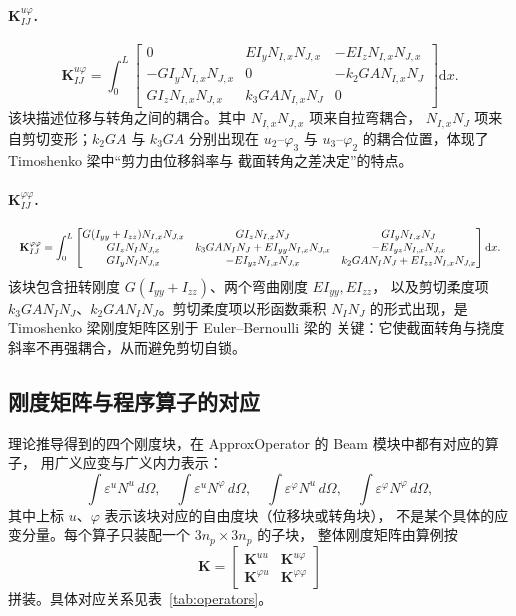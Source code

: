 \documentclass[UTF8,a4paper,11pt]{ctexart}
\newcommand{\ud}{\mathrm{d}}
\newcommand{\bK}{\mathbf{K}}
\begin{document}
\paragraph{$\bK_{IJ}^{u\varphi}$.}
\begin{equation}\label{eq:Kuv}
\bK_{IJ}^{u\varphi}=\int_0^L
\begin{bmatrix}
0 & EI_yN_{I,x}N_{J,x} & -EI_zN_{I,x}N_{J,x}\\
-GI_yN_{I,x}N_{J,x} & 0 & -k_2GAN_{I,x}N_J\\
GI_zN_{I,x}N_{J,x} & k_3GAN_{I,x}N_J & 0
\end{bmatrix}\ud x.
\end{equation}
该块描述位移与转角之间的耦合。其中 $N_{I,x}N_{J,x}$ 项来自拉弯耦合，
$N_{I,x}N_J$ 项来自剪切变形；$k_2GA$ 与 $k_3GA$ 分别出现在 $u_2$--$\varphi_3$
与 $u_3$--$\varphi_2$ 的耦合位置，体现了 Timoshenko 梁中“剪力由位移斜率与
截面转角之差决定”的特点。

\paragraph{$\bK_{IJ}^{\varphi\varphi}$.}
\begin{equation}\label{eq:Kpp}
\resizebox{\textwidth}{!}{$\displaystyle
\bK_{IJ}^{\varphi\varphi}=\int_0^L
\begin{bmatrix}
G(I_{yy}+I_{zz})N_{I,x}N_{J,x} & GI_zN_{I,x}N_J & GI_yN_{I,x}N_J\\
GI_zN_IN_{J,x} & k_3GAN_IN_J+EI_{yy}N_{I,x}N_{J,x} & -EI_{yz}N_{I,x}N_{J,x}\\
GI_yN_IN_{J,x} & -EI_{yz}N_{I,x}N_{J,x} & k_2GAN_IN_J+EI_{zz}N_{I,x}N_{J,x}
\end{bmatrix}\ud x.
$}
\end{equation}
该块包含扭转刚度 $G(I_{yy}+I_{zz})$、两个弯曲刚度 $EI_{yy},EI_{zz}$，
以及剪切柔度项 $k_3GAN_IN_J$、$k_2GAN_IN_J$。剪切柔度项以形函数乘积
$N_IN_J$ 的形式出现，是 Timoshenko 梁刚度矩阵区别于 Euler--Bernoulli 梁的
关键：它使截面转角与挠度斜率不再强耦合，从而避免剪切自锁。

\subsection{刚度矩阵与程序算子的对应}

理论推导得到的四个刚度块，在 ApproxOperator 的 Beam 模块中都有对应的算子，
用广义应变与广义内力表示：
\begin{equation}
\int\varepsilon^{u}N^{u}\,d\Omega,\quad
\int\varepsilon^{u}N^{\varphi}\,d\Omega,\quad
\int\varepsilon^{\varphi}N^{u}\,d\Omega,\quad
\int\varepsilon^{\varphi}N^{\varphi}\,d\Omega,
\end{equation}
其中上标 $u$、$\varphi$ 表示该块对应的自由度块（位移块或转角块），
不是某个具体的应变分量。每个算子只装配一个 $3n_p\times3n_p$ 的子块，
整体刚度矩阵由算例按
\begin{equation}
\bK=\begin{bmatrix}
\bK^{uu} & \bK^{u\varphi}\\
\bK^{\varphi u} & \bK^{\varphi\varphi}
\end{bmatrix}
\end{equation}
拼装。具体对应关系见表~\ref{tab:operators}。
\end{document}
